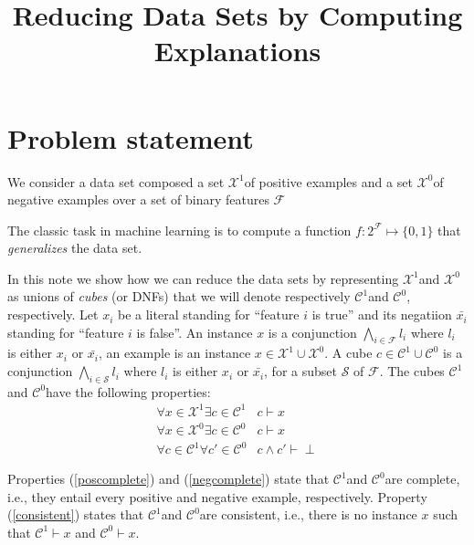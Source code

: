 \documentclass{article}
\title{Reducing Data Sets by Computing Explanations}
\newcommand{\setex}[1]{\ensuremath{{\mathcal X}^{#1}}\xspace}
\newcommand{\posex}{{\setex{1}}}
\newcommand{\negex}{{\setex{0}}}
\newcommand{\setcube}[1]{\ensuremath{{\mathcal C}^{#1}}\xspace}
\newcommand{\poscube}{\ensuremath{\setcube{1}}}
\newcommand{\negcube}{\ensuremath{\setcube{0}}}
\newcommand{\features}{\ensuremath{{\mathcal F}}\xspace}
\newcommand{\classifier}{\ensuremath{f}}
\newcommand{\lit}[1]{\ensuremath{l_{#1}}}
\newcommand{\var}{\ensuremath{x}}
\newcommand{\truelit}[1]{\ensuremath{\var_{#1}}}
\newcommand{\falselit}[1]{\ensuremath{\bar{\var_{#1}}}}
\newcommand{\ex}{\ensuremath{\var}}
\newcommand{\cube}{\ensuremath{c}}
\begin{document}

\maketitle

\section*{Problem statement}

We consider a data set composed a set \posex of positive examples and a set \negex of negative examples over a set of binary features $\features$

The classic task in machine learning is to compute a function $\classifier : 2^{\features} \mapsto \{0,1\}$ that \emph{generalizes} the data set.

In this note we show how we can reduce the data sets by representing \posex and \negex as unions of \emph{cubes} (or DNFs) that we will denote respectively \poscube and \negcube, respectively. Let $\truelit{i}$ be a literal standing for ``feature $i$ is true'' and its negatiion $\falselit{i}$ standing for ``feature $i$ is false''. An instance $\ex$ is a conjunction $\bigwedge_{i \in \features}\lit{i}$ where $\lit{i}$ is either $\truelit{i}$ or $\falselit{i}$, an example is an instance $\ex \in \posex \cup \negex$.
A cube $\cube \in \poscube \cup \negcube$ is a conjunction $\bigwedge_{i \in {\mathcal S}}\lit{i}$ where $\lit{i}$ is either $\truelit{i}$ or $\falselit{i}$, for a subset ${\mathcal S}$ of \features.
The cubes \poscube and \negcube have the following properties:
\begin{eqnarray}
	\forall \ex \in \posex \exists \cube \in \poscube & \cube \vdash \ex \label{poscomplete} \\
	\forall \ex \in \negex \exists \cube \in \negcube & \cube \vdash \ex \label{negcomplete} \\
	\forall \cube \in \poscube  \forall \cube' \in \negcube  & \cube \wedge \cube' \vdash \perp \label{consistent}
\end{eqnarray}

Properties (\ref{poscomplete}) and (\ref{negcomplete}) state that \poscube and \negcube are complete, i.e., they entail every positive and negative example, respectively. Property (\ref{consistent}) states that \poscube and \negcube are consistent, i.e., there is no instance $\ex$ such that $\poscube \vdash \ex$ and $\negcube \vdash \ex$.
\end{document}
